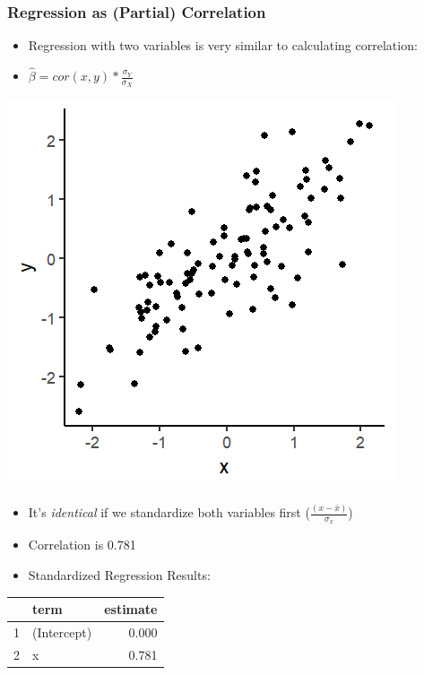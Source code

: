 \documentclass[xcolor=x11names,compress]{beamer}\usepackage[]{graphicx}\usepackage[]{color}
\makeatletter
\def\maxwidth{ %
  \ifdim\Gin@nat@width>\linewidth
    \linewidth
  \else
    \Gin@nat@width
  \fi
}
\newenvironment{knitrout}{}{} %
\renewcommand{\(}{\begin{columns}}
\renewcommand{\)}{\end{columns}}
\newcommand{\<}[1]{\begin{column}{#1}}
\renewcommand{\>}{\end{column}}
\makeatother
\begin{document}
\begin{frame}
\frametitle{Regression as (Partial) Correlation}
\begin{itemize}
\item Regression with two variables is very similar to calculating correlation:
\item $\hat{\beta}=cor(x,y) * \frac{\sigma_Y}{\sigma_X}$
\end{itemize}
\begin{multicols}{2}
\begin{knitrout}
\color{fgcolor}
\includegraphics[width=\maxwidth]{figure/corr_regn_fig3-1} 

\end{knitrout}
\columnbreak
\begin{itemize}
\item It's \textit{identical} if we standardize both variables first ($\frac{(x-\bar{x})}{\sigma_x}$)
\item Correlation is 0.781
\item Standardized Regression Results:
\end{itemize}
\begin{table}[ht]
\centering
\begin{tabular}{rlr}
  \hline
 & term & estimate \\ 
  \hline
1 & (Intercept) & 0.000 \\ 
  2 & x & 0.781 \\ 
   \hline
\end{tabular}
\end{table}

\end{multicols}
\end{frame}
\end{document}
